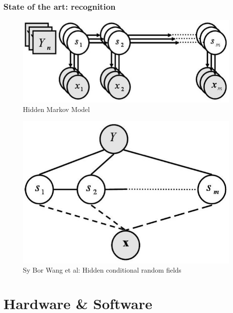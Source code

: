 \documentclass{beamer}
\begin{document}
	\begin{frame}
		\frametitle{State of the art: recognition}
		\begin{figure}
			\includegraphics[scale=0.15]{images/seminar/hmm} 
			\caption{Hidden Markov Model}
		\end{figure}
		
		\begin{figure}
			\includegraphics[scale=0.15]{images/seminar/hcrf} 
			\caption{Sy Bor Wang et al: Hidden conditional random fields}
		\end{figure}
	\end{frame}
	\section{Hardware \& Software}
\end{document}
